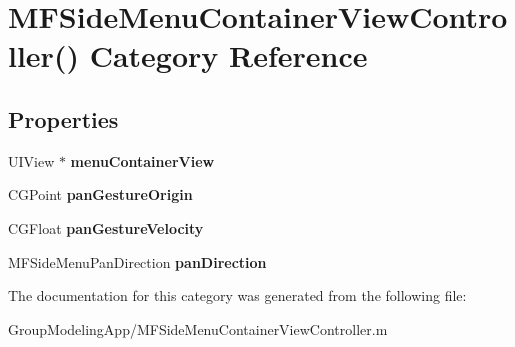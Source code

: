\hypertarget{category_m_f_side_menu_container_view_controller_07_08}{\section{M\-F\-Side\-Menu\-Container\-View\-Controller() Category Reference}
\label{category_m_f_side_menu_container_view_controller_07_08}
}
\subsection*{Properties}
\begin{DoxyCompactItemize}
\item 
\hypertarget{category_m_f_side_menu_container_view_controller_07_08_ace43610b9ba71ee914c426728caebcb7}{U\-I\-View $\ast$ {\bfseries menu\-Container\-View}}\label{category_m_f_side_menu_container_view_controller_07_08_ace43610b9ba71ee914c426728caebcb7}

\item 
\hypertarget{category_m_f_side_menu_container_view_controller_07_08_ab22b3ae21049ea6126b3399910c458f3}{C\-G\-Point {\bfseries pan\-Gesture\-Origin}}\label{category_m_f_side_menu_container_view_controller_07_08_ab22b3ae21049ea6126b3399910c458f3}

\item 
\hypertarget{category_m_f_side_menu_container_view_controller_07_08_a2fee6262ec666a3ba9ef6712a5f56b86}{C\-G\-Float {\bfseries pan\-Gesture\-Velocity}}\label{category_m_f_side_menu_container_view_controller_07_08_a2fee6262ec666a3ba9ef6712a5f56b86}

\item 
\hypertarget{category_m_f_side_menu_container_view_controller_07_08_ac99172d884a172137c0bd03e5eee0e68}{M\-F\-Side\-Menu\-Pan\-Direction {\bfseries pan\-Direction}}\label{category_m_f_side_menu_container_view_controller_07_08_ac99172d884a172137c0bd03e5eee0e68}

\end{DoxyCompactItemize}


The documentation for this category was generated from the following file\-:\begin{DoxyCompactItemize}
\item 
Group\-Modeling\-App/M\-F\-Side\-Menu\-Container\-View\-Controller.\-m\end{DoxyCompactItemize}
